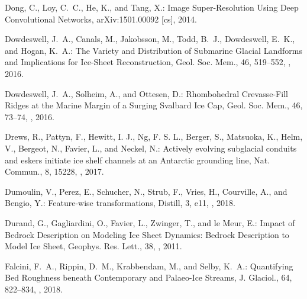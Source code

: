 \documentclass[tc, noline]{copernicus}
\begin{document}
\begin{thebibliography}{95}
Dong, C., Loy, C.~C., He, K., and Tang, X.:
Image Super-Resolution Using Deep Convolutional Networks,
arXiv:1501.00092 [cs], 2014.

Dowdeswell, J.~A., Canals, M., Jakobsson, M., Todd, B.~J., Dowdeswell, E.~K., and Hogan, K.~A.:
The Variety and Distribution of Submarine Glacial Landforms and Implications for Ice-Sheet Reconstruction,
Geol. Soc. Mem.,
46, 519--552, , 2016{}.

Dowdeswell, J.~A., Solheim, A., and Ottesen, D.:
Rhombohedral Crevasse-Fill Ridges at the Marine Margin of a Surging Svalbard Ice Cap,
Geol. Soc. Mem.,
46, 73--74, , 2016{}.

Drews, R., Pattyn, F., Hewitt, I. J., Ng, F. S. L., Berger, S., Matsuoka, K., Helm, V., Bergeot, N., Favier, L., and Neckel, N.: Actively evolving subglacial conduits and eskers initiate ice shelf channels at an Antarctic grounding line, Nat. Commun., 8, 15228, , 2017.

Dumoulin, V., Perez, E., Schucher, N., Strub, F., Vries, H., Courville, A., and Bengio, Y.: Feature-wise transformations, Distill, 3, e11, , 2018.

Durand, G., Gagliardini, O., Favier, L., Zwinger, T., and {le Meur}, E.:
Impact of Bedrock Description on Modeling Ice Sheet Dynamics: Bedrock Description to Model Ice Sheet,
Geophys. Res. Lett.,
38, , 2011.


Falcini, F.~A., Rippin, D.~M., Krabbendam, M., and Selby, K.~A.:
Quantifying Bed Roughness beneath Contemporary and Palaeo-Ice Streams,
J. Glaciol.,
64, 822--834, , 2018.


\end{thebibliography}
\end{document}
